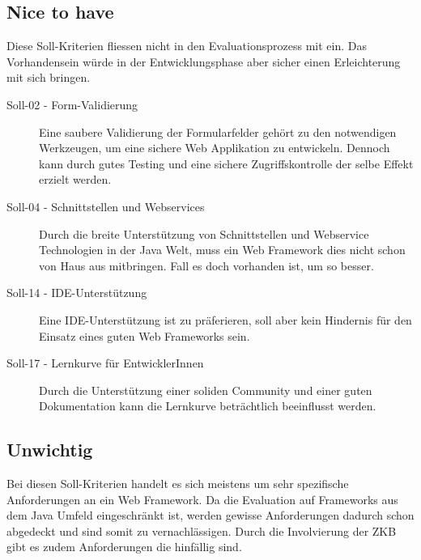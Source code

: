   \subsection{Nice to have}
  
  Diese Soll-Kriterien fliessen nicht in den Evaluationsprozess mit ein. Das
  Vorhandensein würde in der Entwicklungsphase aber sicher einen Erleichterung
  mit sich bringen.
  \newline
  
  \begin{description}
  \item[Soll-02 - Form-Validierung]
  Eine saubere Validierung der Formularfelder gehört zu den notwendigen
  Werkzeugen, um eine sichere Web Applikation zu entwickeln. Dennoch kann durch
  gutes Testing und eine sichere Zugriffskontrolle der selbe Effekt erzielt
  werden.
  
  \item[Soll-04 - Schnittstellen und Webservices]
  Durch die breite Unterstützung von Schnittstellen und Webservice Technologien
  in der Java Welt, muss ein Web Framework dies nicht schon von Haus aus
  mitbringen. Fall es doch vorhanden ist, um so besser.
  
  \item[Soll-14 - IDE-Unterstützung]
  Eine IDE-Unterstützung ist zu präferieren, soll aber kein Hindernis für den
  Einsatz eines guten Web Frameworks sein.
  
  \item[Soll-17 - Lernkurve für EntwicklerInnen]
  Durch die Unterstützung einer soliden Community und einer guten Dokumentation
  kann die Lernkurve beträchtlich beeinflusst werden.
  \end{description}
  
  \subsection{Unwichtig}
  
  Bei diesen Soll-Kriterien handelt es sich meistens um sehr spezifische
  Anforderungen an ein Web Framework. Da die Evaluation auf Frameworks aus dem
  Java Umfeld eingeschränkt ist, werden gewisse Anforderungen dadurch schon
  abgedeckt und sind somit zu vernachlässigen. Durch die Involvierung der
  \ac{ZKB} gibt es zudem Anforderungen die hinfällig sind.
  \newline
  
